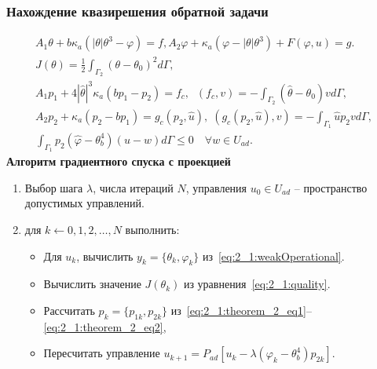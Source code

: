 \begin{frame}
    \frametitle{Нахождение квазирешения обратной задачи}
    \begin{gather}
        A_1 \theta + b \kappa_a (| \theta | \theta^3 - \varphi) =
        f, A_2 \varphi + \kappa_a (\varphi - |\theta|\theta^3) + F(\varphi, u) = g.
        \label{eq:2_1:weakOperational}\\
        J(\theta) = \frac{1}{2} \int_{\Gamma_2} (\theta - \theta_0)^2 d\Gamma,
        \label{eq:2_1:qualityOperational}\\
        A_1 p_1 + 4 |\hat{\theta}|^3 \kappa_a(b p_1 - p_2) = f_c,
        \;\; (f_c,v) = - \int_{\Gamma_2} (\hat{\theta} - \theta_0) v d\Gamma,
        \label{eq:2_1:theorem_2_eq1}\\
        A_2 p_2 + \kappa_a (p_2-b p_1) = g_c(p_2, \hat{u}),
        \;(g_c(p_2, \hat{u}), v) = -\int_{\Gamma_1} \hat{u} p_2 v d\Gamma,
        \label{eq:2_1:theorem_2_eq2}\\
        \int_{\Gamma_1} p_2 (\hat{\varphi} - \theta_b^4)(u-w) d\Gamma
        \leq 0 \quad \forall w \in U_{ad}. \label{eq:2_1:theorem_2_eq3}
    \end{gather}
    \textbf{Алгоритм градиентного спуска с проекцией}
    \begin{enumerate}
        \item Выбор шага $\lambda$, числа итераций $N$, управления $u_0 \in U_{ad}$
        -- пространство допустимых управлений.
        \item для $k \leftarrow 0,1,2, \ldots, N$ выполнить:
        \begin{itemize}
            \item Для $u_{k}$, вычислить $y_k = \{\theta_k, \varphi_k\}$ из~\eqref{eq:2_1:weakOperational}.
            \item Вычислить значение $J(\theta_k)$ из уравнения~\eqref{eq:2_1:quality}.
            \item Рассчитать $p_k=\{p_{1k},p_{2k}\}$
            из~\eqref{eq:2_1:theorem_2_eq1}--\eqref{eq:2_1:theorem_2_eq2},
            \item Пересчитать управление
            $u_{k+1} = P_{ad}\left[ u_k - \lambda (\varphi_k - \theta_b^4)p_{2k} \right]$.
        \end{itemize}
    \end{enumerate}
\end{frame}
